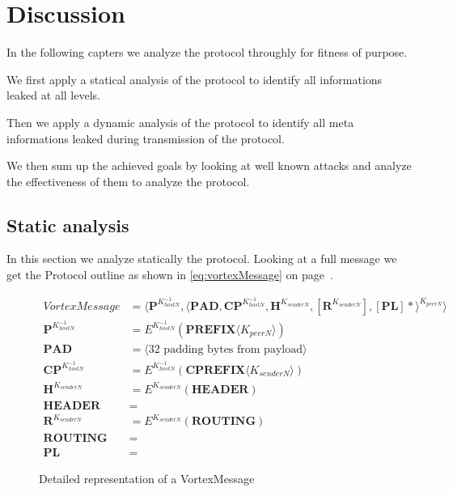 
\part{Discussion \label{sec:discussion}}
In the following capters we analyze the protocol throughly for fitness of purpose. 

We first apply a statical analysis of the protocol to identify all informations leaked at all levels.

Then we apply a dynamic analysis of the protocol to identify all meta informations leaked during transmission of the protocol.

We then sum up the achieved goals by looking at well known attacks and analyze the effectiveness of them to analyze the protocol.

\chapter{Static analysis}
In this section we analyze statically the protocol. Looking at a full message we get the Protocol outline as shown in \eqref{eq:vortexMessage} on page~\pageref{eq:vortexMessage}.

\begin{figure*}[!h]
	\begin{align}
VortexMessage                     & = \langle \mathbf{P}^{K^{-1}_{hostN}}, \langle\mathbf{PAD}, \mathbf{CP}^{K^{-1}_{hostN}}, \mathbf{H}^{K_{senderN}}, \left[\mathbf{R}^{K_{senderN}}\right], \left[\mathbf{PL}\right]*\rangle^{K_{peerN}} \rangle\label{eq:vortexMessage}\\ 
\mathbf{P}^{K^{-1}_{hostN}}       & = E^{K^{-1}_{hostN}}\left(\mathbf{PREFIX}\langle K_{peerN}\rangle \right)\\
\mathbf{PAD}                      & = \langle \text{32 padding bytes from payload} \rangle\\
\mathbf{CP}^{K^{-1}_{hostN}}      & = E^{K^{-1}_{hostN}}\left(\mathbf{CPREFIX}\langle K_{senderN}\rangle \right)\\
\mathbf{H}^{K_{senderN}}          & = E^{K_{senderN}}\left(\mathbf{HEADER}\right)\\
\mathbf{HEADER} 				  & = \\
\mathbf{R}^{K_{senderN}}          & = E^{K_{senderN}}\left(\mathbf{ROUTING}\right)\\
\mathbf{ROUTING}				  & = \\
\mathbf{PL}                       & = 
	\end{align}
	\caption{Detailed representation of a VortexMessage}
\end{figure*}

